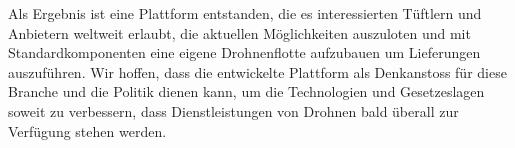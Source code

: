 Als Ergebnis ist eine Plattform entstanden, die es interessierten Tüftlern und Anbietern weltweit erlaubt, die aktuellen Möglichkeiten auszuloten und mit Standardkomponenten eine eigene Drohnenflotte aufzubauen um Lieferungen auszuführen. Wir hoffen, dass die entwickelte Plattform als Denkanstoss für diese Branche und die Politik dienen kann, um die Technologien und Gesetzeslagen soweit zu verbessern, dass Dienstleistungen von Drohnen bald überall zur Verfügung stehen werden.
